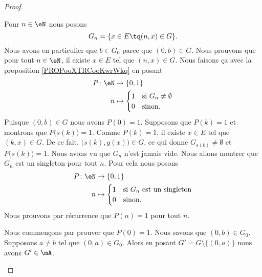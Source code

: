 \begin{proof}
\begin{subproof}
		Pour \( n\in \eN\) nous posons
		\begin{equation}
			G_n=\{ x\in E\tq (n,x)\in G \}.
		\end{equation}
		Nous avons en particulier que \( b\in G_0\) parce que \( (0,b)\in G\).
		Nous prouvons que pour tout \( n\in \eN\), il existe \( x\in E\) tel que \( (n,x)\in G\). Nous faisons ça avec la proposition \ref{PROPooXTRCooKwrWkq} en posant
		\begin{equation}
			\begin{aligned}
				P\colon \eN & \to \{ 0,1 \}                           \\
				n           & \mapsto \begin{cases}
					                      1 & \text{si } G_n\neq\emptyset \\
					                      0 & \text{sinon.}
				                      \end{cases}
			\end{aligned}
		\end{equation}
		Puisque \( (0,b)\in G\) nous avons \( P(0)=1\). Supposons que \( P(k)=1\) et montrons que \( P\big( s(k) \big)=1\). Comme \( P(k)=1\), il existe \( x\in E\) tel que \( (k,x)\in G\). De ce fait, \( \big( s(k),g(x) \big)\in G\), ce qui donne \( G_{s(k)}\neq \emptyset\) et \( P\big( s(k) \big)=1\).
		Nous avons vu que \( G_n\) n'est jamais vide. Nous allons montrer que \( G_n\) est un singleton pour tout \( n\). Pour cela nous posons
		\begin{equation}
			\begin{aligned}
				P\colon \eN & \to \{ 0,1 \}                                        \\
				n           & \mapsto \begin{cases}
					                      1 & \text{si }  G_n \text{ est un singleton} \\
					                      0 & \text{sinon. }
				                      \end{cases}
			\end{aligned}
		\end{equation}
		Nous prouvons par récurrence que \( P(n)=1\) pour tout \( n\).
		\begin{subproof}
			\spitem[\( P(0)=1\)]
			Nous commençons par prouver que \( P(0)=1\). Nous savons que \( (0,b)\in G_0\). Supposons \( a\neq b\) tel que \( (0,a)\in G_0\). Alors en posant \( G'=G\setminus\{ (0,a) \}\) nous avons \( G'\in \mA\).


\end{subproof}
\end{subproof}
\end{proof}
